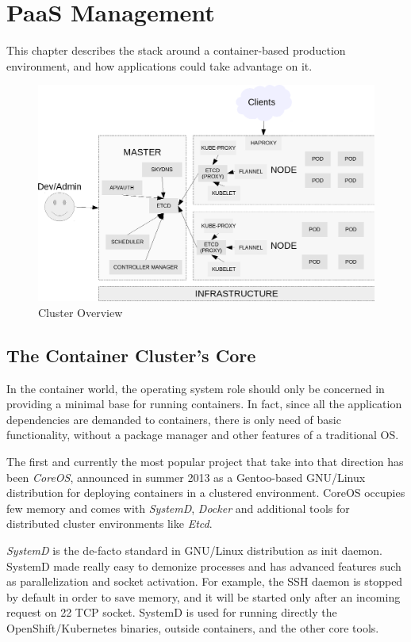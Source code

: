 \chapter{PaaS Management}\label{paas-management}

This chapter describes the stack around a container-based production
environment, and how applications could take advantage on it.

\begin{figure}[htbp]
\centering
\includegraphics{media/ch5-overview.png}
\caption{Cluster Overview}
\end{figure}

\section{The Container Cluster's Core}\label{the-container-clusters-core}

In the container world, the operating system role should only be concerned in providing a minimal base for running containers.  In fact, since all the application dependencies are demanded to containers, there is only need of basic functionality, without a package manager and other features of a traditional OS.

The first and currently the most popular project that take into that direction has been \textit{CoreOS}, announced in summer 2013 as a Gentoo-based GNU/Linux distribution for deploying containers in a clustered environment. CoreOS occupies few memory and comes with \textit{SystemD}, \textit{Docker} and additional tools for distributed cluster environments like \textit{Etcd}.

\textit{SystemD} is the de-facto standard in GNU/Linux distribution as init daemon. SystemD made really easy to demonize processes and has advanced features such as parallelization and socket activation.  For example, the SSH daemon is stopped by default in order to save memory, and it will be started only after an incoming request on 22 TCP socket.  SystemD is used for running directly the OpenShift/Kubernetes binaries, outside containers, and the other core tools.

